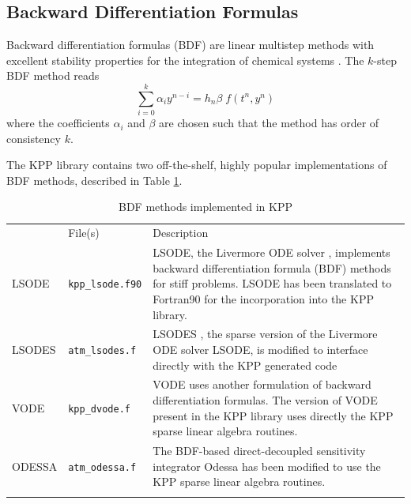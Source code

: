 \documentclass[twoside]{article}
\newcommand{\hhline}{\noalign{\vspace{1mm}}\hline\noalign{\vspace{1mm}}}
\begin{document}
\subsection{Backward Differentiation Formulas}

Backward differentiation formulas (BDF) are linear multistep methods with
excellent stability properties for the integration of chemical systems
\citep[Section V.1]{k:HW2}.  The $k$-step BDF method reads
%
\begin{equation}
\sum_{i=0}^k \alpha_i y^{n-i} = h_n \beta\; f\left(t^{n},y^{n}\right)
\label{BDF}
\end{equation}
%
where the coefficients $\alpha_i$ and $\beta$ are chosen such that the
method has order of consistency $k$.

The KPP library contains two off-the-shelf, highly popular
implementations of BDF methods, described in Table \ref{tab:BDF}.

\begin{table}
\begin{center}
\caption{BDF methods implemented in KPP}
\label{tab:BDF}
\begin{tabular}{lp{2cm}p{10cm}}
\hhline
\multicolumn{1}{c}{Method} & File(s) & Description \\
\hhline
LSODE & {\tt kpp\_lsode.f90} & LSODE, the Livermore ODE solver
\citep{LSODE}, implements  backward differentiation formula (BDF) methods
for stiff problems. LSODE has been translated to Fortran90 for the
incorporation into the KPP library.\\
LSODES &{\tt atm\_lsodes.f}&
LSODES \citep{LSODE}, the sparse version of the Livermore ODE solver
LSODE, is modified to interface directly with the KPP generated code \\
VODE & {\tt kpp\_dvode.f} &  VODE \citep{VODE} uses another formulation of backward
differentiation formulas. The version of VODE present in the KPP library
uses directly the KPP sparse linear algebra routines. \\
ODESSA &{\tt atm\_odessa.f}&  The BDF-based direct-decoupled sensitivity
integrator Odessa \citep{k:Leis86a} has been modified to use the KPP
sparse linear algebra routines.\\
\hhline
\end{tabular}
\end{center}
\end{table}
\end{document}
